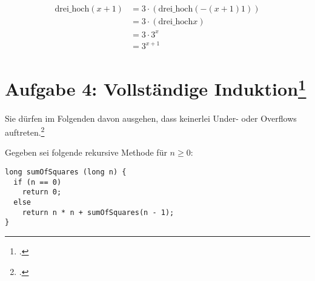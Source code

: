 \documentclass{lehramt-informatik}
\begin{document}
\begin{antwort}

\begin{align*}
\text{drei\_hoch} (x + 1)
& = 3 \cdot (\text{drei\_hoch} (- (x + 1) 1))\\
& = 3 \cdot (\text{drei\_hoch} x)\\
& = 3 \cdot 3^x\\
& = 3^{x+1}
\end{align*}
\end{antwort}

%

\section{Aufgabe 4: Vollständige Induktion\footcite{sosy:ab:8}}

Sie dürfen im Folgenden davon ausgehen, dass keinerlei Under- oder
Overflows auftreten.\footcite[nach Frühjahr 2017 (66115) - Thema 1,
Aufgabe 4]{examen:66115:2017:03}

\noindent
Gegeben sei folgende rekursive Methode für $n \geq 0$:

\begin{verbatim}
long sumOfSquares (long n) {
  if (n == 0)
    return 0;
  else
    return n * n + sumOfSquares(n - 1);
}
\end{verbatim}
\end{document}
